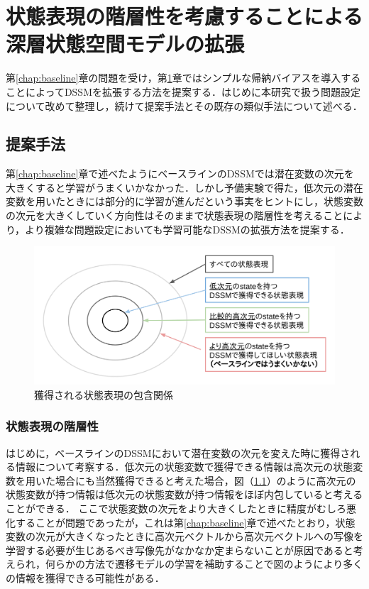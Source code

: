\chapter{状態表現の階層性を考慮することによる深層状態空間モデルの拡張}
\label{chap:proposal}

第\ref{chap:baseline}章の問題を受け，第\ref{chap:proposal}章ではシンプルな帰納バイアスを導入することによってDSSMを拡張する方法を提案する．はじめに本研究で扱う問題設定について改めて整理し，続けて提案手法とその既存の類似手法について述べる．

\section{提案手法}
第\ref{chap:baseline}章で述べたようにベースラインのDSSMでは潜在変数の次元を大きくすると学習がうまくいかなかった．しかし予備実験で得た，低次元の潜在変数を用いたときには部分的に学習が進んだという事実をヒントにし，状態変数の次元を大きくしていく方向性はそのままで状態表現の階層性を考えることにより，より複雑な問題設定においても学習可能なDSSMの拡張方法を提案する．

\begin{figure}[tp]
  \begin{center}
    \includegraphics[width=\linewidth]{./figures/hierarchical.png}
    \caption{獲得される状態表現の包含関係}
    \label{fig:hierarchical}
  \end{center}
\end{figure}

\subsection{状態表現の階層性}
はじめに，ベースラインのDSSMにおいて潜在変数の次元を変えた時に獲得される情報について考察する．低次元の状態変数で獲得できる情報は高次元の状態変数を用いた場合にも当然獲得できると考えた場合，図（\ref{fig:hierarchical}）のように高次元の状態変数が持つ情報は低次元の状態変数が持つ情報をほぼ内包していると考えることができる．
ここで状態変数の次元をより大きくしたときに精度がむしろ悪化することが問題であったが，これは第\ref{chap:baseline}章で述べたとおり，状態変数の次元が大きくなったときに高次元ベクトルから高次元ベクトルへの写像を学習する必要が生じあるべき写像先がなかなか定まらないことが原因であると考えられ，何らかの方法で遷移モデルの学習を補助することで図のようにより多くの情報を獲得できる可能性がある．

